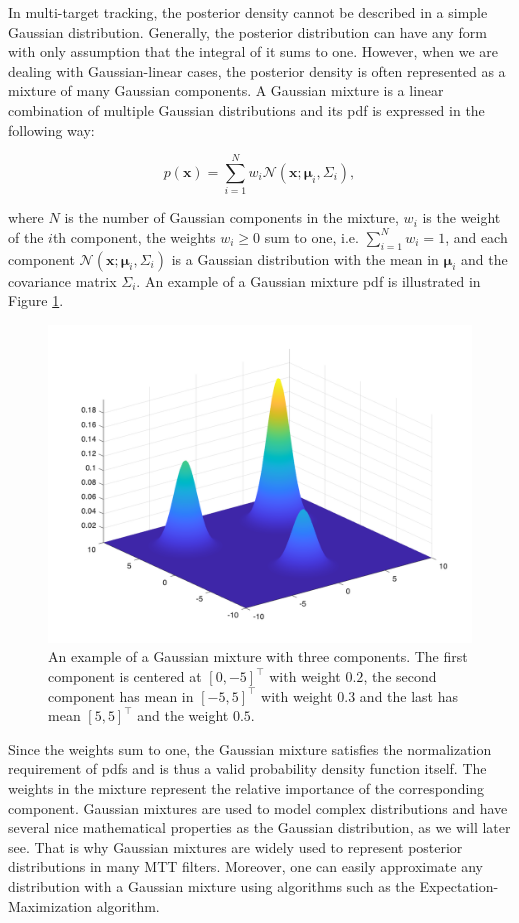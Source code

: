 In multi-target tracking, the posterior density cannot be described in a simple Gaussian distribution. Generally, the posterior distribution can have any form with only assumption that the integral of it sums to one. However, when we are dealing with Gaussian-linear cases, the posterior density is often represented as a mixture of many Gaussian components. A Gaussian mixture is a linear combination of multiple Gaussian distributions and its pdf is expressed in the following way:

\begin{equation}\label{eq:gaussian-mixture}
    p(\mathbf{x}) = \sum_{i=1}^N w_i \mathscr{N}\left(\mathbf{x}; \boldsymbol{\mu}_i, \Sigma_i\right),
\end{equation}

\noindent where $N$ is the number of Gaussian components in the mixture, $w_i$ is the weight of the $i$th component, the weights $w_i \geq 0$ sum to one, i.e. $\sum_{i=1}^N w_i = 1$, and each component $\mathscr{N}\left(\mathbf{x}; \boldsymbol{\mu}_i, \Sigma_i\right)$ is a Gaussian distribution with the mean in $\boldsymbol{\mu}_i$ and the covariance matrix $\Sigma_i$. An example of a Gaussian mixture pdf is illustrated in Figure \ref{fig:gaussian-mixture}.

\begin{figure}
\centering
  \includegraphics[width=.6\linewidth]{figures/gaussian-mixture.png}
  \caption[An example of a Gaussian mixture.]{An example of a Gaussian mixture with three components. The first component is centered at $[0, -5]^\intercal$ with weight $0.2$, the second component has mean in $[-5, 5]^\intercal$ with weight $0.3$ and the last has mean $[5, 5]^\intercal$ and the weight $0.5$.}
  \label{fig:gaussian-mixture}
\end{figure}

Since the weights sum to one, the Gaussian mixture satisfies the normalization requirement of pdfs and is thus a valid probability density function itself. The weights in the mixture represent the relative importance of the corresponding component. Gaussian mixtures are used to model complex distributions and have several nice mathematical properties as the Gaussian distribution, as we will later see. That is why Gaussian mixtures are widely used to represent posterior distributions in many MTT filters. Moreover, one can easily approximate any distribution with a Gaussian mixture using algorithms such as the Expectation-Maximization algorithm.

